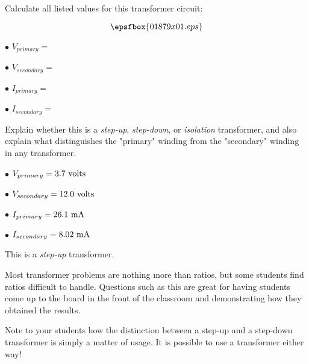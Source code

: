 

Calculate all listed values for this transformer circuit:

$$\epsfbox{01879x01.eps}$$

\medskip
\item{$\bullet$} $V_{primary} = $
\item{$\bullet$} $V_{secondary} = $
\item{$\bullet$} $I_{primary} = $
\item{$\bullet$} $I_{secondary} = $
\medskip

Explain whether this is a {\it step-up}, {\it step-down}, or {\it isolation} transformer, and also explain what distinguishes the "primary" winding from the "secondary" winding in any transformer.







\medskip
\item{$\bullet$} $V_{primary} = 3.7 \hbox{ volts}$
\item{$\bullet$} $V_{secondary} = 12.0 \hbox{ volts}$
\item{$\bullet$} $I_{primary} = 26.1 \hbox{ mA}$
\item{$\bullet$} $I_{secondary} = 8.02 \hbox{ mA}$
\medskip

This is a {\it step-up} transformer.







Most transformer problems are nothing more than ratios, but some students find ratios difficult to handle.  Questions such as this are great for having students come up to the board in the front of the classroom and demonstrating how they obtained the results.

Note to your students how the distinction between a step-up and a step-down transformer is simply a matter of usage.  It is possible to use a transformer either way!




